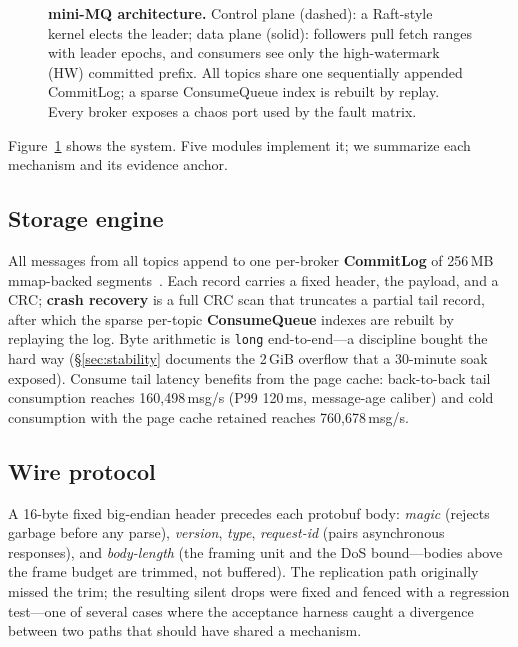\documentclass[letterpaper,twocolumn,10pt]{article}
\begin{document}
\begin{figure}[t]
\caption{\textbf{mini-MQ architecture.} Control plane (dashed): a
Raft-style kernel elects the leader; data plane (solid): followers pull
fetch ranges with leader epochs, and consumers see only the high-watermark
(HW) committed prefix. All topics share one sequentially appended
CommitLog; a sparse ConsumeQueue index is rebuilt by replay. Every broker
exposes a chaos port used by the fault matrix.}
\label{fig:arch}
\end{figure}

Figure~\ref{fig:arch} shows the system. Five modules implement it;
we summarize each mechanism and its evidence anchor.

\subsection{Storage engine}
All messages from all topics append to one per-broker \textbf{CommitLog}
of 256\,MB mmap-backed segments~\cite{mmap2}. Each record carries a fixed
header, the payload, and a CRC; \textbf{crash recovery} is a full CRC scan
that truncates a partial tail record, after which the sparse per-topic
\textbf{ConsumeQueue} indexes are rebuilt by replaying the log. Byte
arithmetic is \texttt{long} end-to-end---a discipline bought the hard way
(\S\ref{sec:stability} documents the 2\,GiB overflow that a 30-minute
soak exposed). Consume tail latency benefits from the page cache:
back-to-back tail consumption reaches 160{,}498\,msg/s (P99 120\,ms,
message-age caliber) and cold consumption with the page cache retained
reaches 760{,}678\,msg/s.

\subsection{Wire protocol}
A 16-byte fixed big-endian header precedes each protobuf body:
\emph{magic} (rejects garbage before any parse), \emph{version},
\emph{type}, \emph{request-id} (pairs asynchronous responses), and
\emph{body-length} (the framing unit and the DoS bound---bodies above the
frame budget are trimmed, not buffered). The replication path originally
missed the trim; the resulting silent drops were fixed and fenced with a
regression test---one of several cases where the acceptance harness
caught a divergence between two paths that should have shared a
mechanism.
\end{document}
